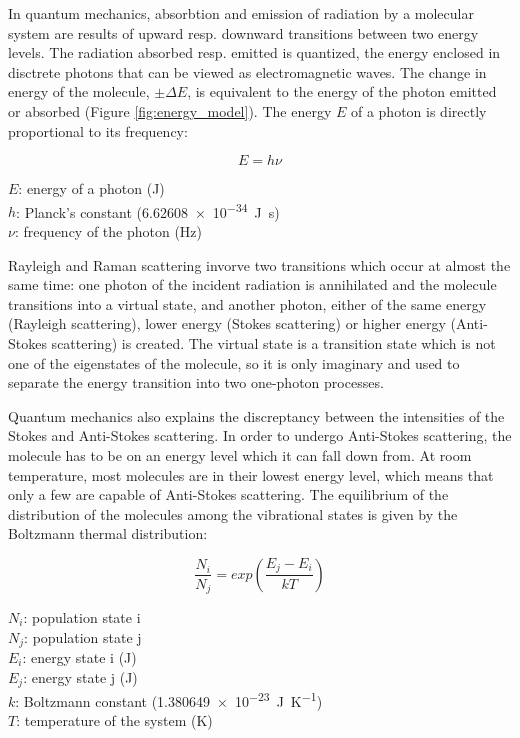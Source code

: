 In quantum mechanics, absorbtion and emission of radiation by a molecular system are results of upward resp. downward transitions between two energy levels. The radiation absorbed resp. emitted is quantized, the energy enclosed in disctrete photons that can be viewed as electromagnetic waves. The change in energy of the molecule, \(\pm\Delta E\), is equivalent to the energy of the photon emitted or absorbed (Figure \ref{fig:energy_model}). The energy \(E\) of a photon is directly proportional to its frequency:

\begin{equation}
    E = h \nu
\end{equation}

\( E\): energy of a photon (\unit{\joule})\\
\( h\): Planck's constant (\SI{6.62608e-34}{\joule\second})\\
\(\nu\): frequency of the photon (\unit{\hertz})

\bigskip

Rayleigh and Raman scattering invorve two transitions which occur at almost the same time: one photon of the incident radiation is annihilated and the molecule transitions into a virtual state, and another photon, either of the same energy (Rayleigh scattering), lower energy (Stokes scattering) or higher energy (Anti-Stokes scattering) is created. The virtual state is a transition state which is not one of the eigenstates of the molecule, so it is only imaginary and used to separate the energy transition into two one-photon processes. 

\bigskip

Quantum mechanics also explains the discreptancy between 
 the intensities of the Stokes and Anti-Stokes scattering. In order to undergo Anti-Stokes scattering, the molecule has to be on an energy level which it can fall down from. At room temperature, most molecules are in their lowest energy level, which means that only a few are capable of Anti-Stokes scattering. The equilibrium of the distribution of the molecules among the vibrational states is given by the Boltzmann thermal distribution:

 \begin{equation}
    \frac{N_i}{N_j} = exp \left( \frac{E_j-E_i}{kT}\right)
 \end{equation}

\(N_i\): population state i \\
\(N_j\): population state j \\
\(E_i\): energy state i (\unit{\joule})\\
\(E_j\): energy state j (\unit{\joule})\\
\(k\): Boltzmann constant (\SI{1.380649e-23}{\joule\per\kelvin})\\
\(T\): temperature of the system (\unit{\kelvin})

